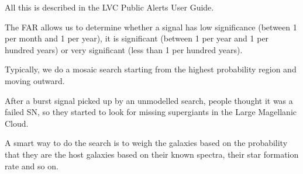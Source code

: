 \documentclass[main.tex]{subfiles}
\begin{document}
All this is described in the LVC Public Alerts User Guide. 

The FAR allows us to determine whether a signal has low significance (between 1 per month and 1 per year), it is significant (between 1 per year and 1 per hundred years) or very significant (less than 1 per hundred years). 

Typically, we do a mosaic search starting from the highest probability region and moving outward. 

After a burst signal picked up by an unmodelled search, people thought it was a failed SN, so they started to look for missing supergiants in the Large Magellanic Cloud. 

A smart way to do the search is to weigh the galaxies based on the probability that they are the host galaxies based on their known spectra, their star formation rate and so on. 
\end{document}

